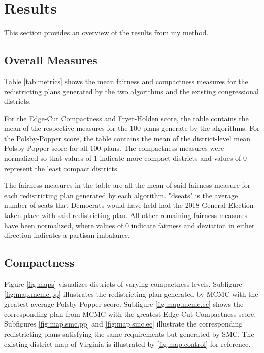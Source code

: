 \section{Results}

This section provides an overview of the results from my method. 

\subsection{Overall Measures}


Table \ref{tab:metrics} shows the mean fairness and compactness measures for the redistricting plans generated by the two algorithms and the existing congressional districts. 

For the Edge-Cut Compactness and Fryer-Holden score, the table contains the mean of the respective measures for the 100 plans generate by the algorithms. For the Polsby-Popper score, the table contains the mean of the district-level mean Polsby-Popper score for all 100 plans. The compactness measures were normalized so that values of 1 indicate more compact districts and values of 0 represent the least compact districts. 

The fairness measures in the table are all the mean of said fairness measure for each redistricting plan generated by each algorithm. "dseats" is the average number of seats that Democrats would have held had the 2018 General Election taken place with said redistricting plan. All other remaining fairness measures have been normalized, where values of 0 indicate fairness and deviation in either direction indicates a partisan imbalance. 

\subsection{Compactness}


Figure \ref{fig:maps} visualizes districts of varying compactness levels. Subfigure \ref{fig:map.mcmc.pp} illustrates the redistricting plan generated by MCMC with the greatest average Polsby-Popper score. Subfigure \ref{fig:map.mcmc.ec} shows the corresponding plan from MCMC with the greatest Edge-Cut Compactness score. Subfigures \ref{fig:map.smc.pp} and \ref{fig:map.smc.ec} illustrate the corresponding redistricting plans satisfying the same requirements but generated by SMC. The existing district map of Virginia is illustrated by \ref{fig:map.control} for reference. 

